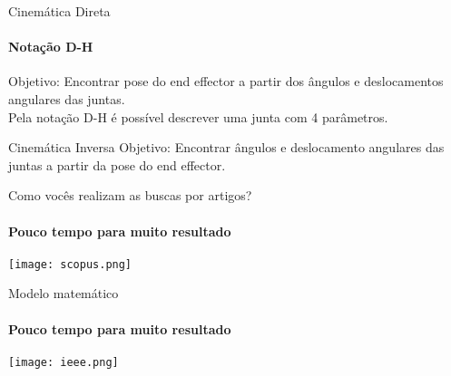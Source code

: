 \begin{frame}[c]{Cinemática Direta} 
    \framesubtitle{Notação D-H}
    Objetivo: Encontrar pose do end effector a partir dos ângulos e deslocamentos angulares das juntas. \\
    Pela notação D-H é possível descrever uma junta com 4 parâmetros.\\
\end{frame}
\begin{frame}[c]{Cinemática Inversa} 
    Objetivo: Encontrar ângulos e deslocamento angulares das juntas a partir da pose do end effector.
\end{frame}
\begin{frame}[c]{Como vocês realizam as buscas por artigos?} 
    \framesubtitle{Pouco tempo para muito resultado}
    \transdissolve[duration=0.5]
   
    \centering
    \texttt{[image: scopus.png]}
\end{frame}
\begin{frame}[c]{Modelo matemático} 
    \framesubtitle{Pouco tempo para muito resultado}
    \transdissolve[duration=0.5]
   
    \centering
    \texttt{[image: ieee.png]}
\end{frame}
